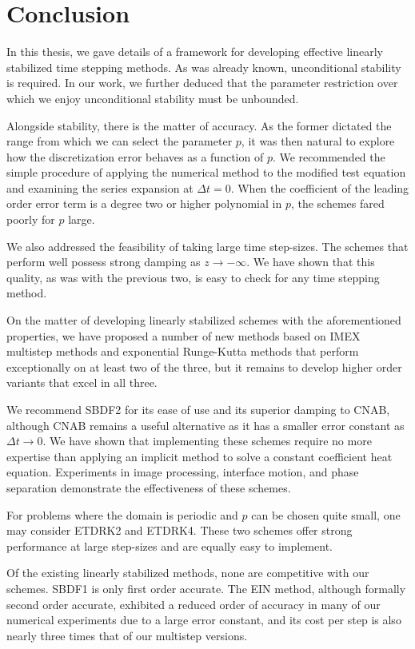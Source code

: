\chapter{Conclusion}
In this thesis, we gave details of a framework for developing effective linearly stabilized time stepping methods. As was already known, unconditional stability is required. In our work, we further deduced that the parameter restriction over which we enjoy unconditional stability must be unbounded. 

Alongside stability, there is the matter of accuracy. As the former dictated the range from which we can select the parameter $p$, it was then natural to explore how the discretization error behaves as a function of $p$. We recommended the simple procedure of applying the numerical method to the modified test equation and examining the series expansion at $\Delta t = 0$. When the coefficient of the leading order error term is a degree two or higher polynomial in $p$, the schemes fared poorly for $p$ large.

We also addressed the feasibility of taking large time step-sizes. The schemes that perform well possess strong damping as $z\to-\infty$. We have shown that this quality, as was with the previous two, is easy to check for any time stepping method.

On the matter of developing linearly stabilized schemes with the aforementioned properties, we have proposed a number of new methods based on IMEX multistep methods and exponential Runge-Kutta methods that perform exceptionally on at least two of the three, but it remains to develop higher order variants that excel in all three.

We recommend SBDF2 for its ease of use and its superior damping to CNAB, although CNAB remains a useful alternative as it has a smaller error constant as $\Delta t \to 0$. We have shown that implementing these schemes require no more expertise than applying an implicit method to solve a constant coefficient heat equation. Experiments in image processing, interface motion, and phase separation demonstrate the effectiveness of these schemes.

For problems where the domain is periodic and $p$ can be chosen quite small, one may consider ETDRK2 and ETDRK4. These two schemes offer strong performance at large step-sizes and are equally easy to implement.

Of the existing linearly stabilized methods, none are competitive with our schemes. 
SBDF1 is only first order accurate. The EIN method, although formally second order accurate, exhibited a reduced order of accuracy in many of our numerical experiments due to a large error constant, and its cost per step is also nearly three times that of our multistep versions. 

